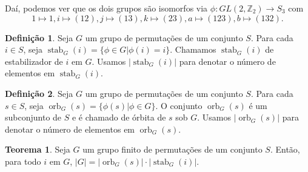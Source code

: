 \documentclass[a4paper,portuguese,11pt,twoside, leqno]{book}
\DeclareMathOperator{\stab}{stab}
\DeclareMathOperator{\orb}{orb}
\theoremstyle{definition}
\newtheorem{theorem}{Teorema}[section]
\newtheorem{deff}{Definição}[section]
\begin{document}
	\par\vspace{0.3cm} Daí, podemos ver que os dois grupos são isomorfos via $\phi:GL(2, \mathbb{Z}_2)\to S_3$ com 
	\begin{equation*}
	1\mapsto 1, i\mapsto(12), j\mapsto(13), k\mapsto(23), a\mapsto(123), b\mapsto(132).
	\end{equation*}
	\par\vspace{0.3cm}
	
	\begin{deff}
		\label{def estabilizador}
		Seja $G$ um grupo de permutações de um conjunto $S$. Para cada $i\in S$, seja $\stab_G(i) = \{ \phi\in G | \phi(i) = i\}$. Chamamos $\stab_G(i)$ de estabilizador de $i$ em $G$. Usamos $|\stab_G(i)|$ para denotar o número de elementos em $\stab_G(i)$.
	\end{deff}
	
	\begin{deff}
		\label{def orbita}
		Seja $G$ um grupo de permutações de um conjunto $S$. Para cada $s\in S$, seja $\orb_G(s) = \{ \phi(s) | \phi\in G \}$. O conjunto $\orb_G(s)$ é um subconjunto de $S$ e é chamado de órbita de $s$ sob $G$. Usamos $|\orb_G(s)|$ para denotar o número de elementos em $\orb_G(s)$.
	\end{deff}
	
	\begin{theorem}
		\label{orb-stab}
		Seja $G$ um grupo finito de permutações de um conjunto $S$. Então, para todo $i$ em $G$, $|G| = |\orb_G(s)|\cdot|\stab_G(i)|$.
	\end{theorem}
	
\end{document}
